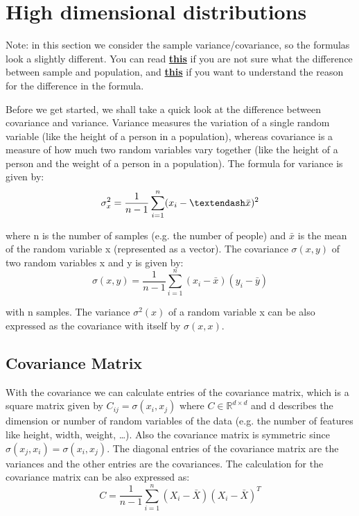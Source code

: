 \documentclass[11pt]{article}
\begin{document}
\section{High dimensional distributions}

Note: in this section we consider the sample variance/covariance, so the formulas look a slightly different. You can read {\color{blue}\href{https://www.macroption.com/population-sample-variance-standard-deviation/}{\textbf{this}}} if you are not sure what the difference between sample and population, and {\color{blue}\href{https://en.wikipedia.org/wiki/Bias_of_an_estimator}{\textbf{this}}} if you want to understand the reason for the difference in the formula. 

Before we get started, we shall take a quick look at the difference between covariance and variance. Variance measures the variation of a single random variable (like the height of a person in a population), whereas covariance is a measure of how much two random variables vary together (like the height of a person and the weight of a person in a population). The formula for variance is given by:
$$\sigma^2_x = \frac{1}{n-1} \sum^{n}_{i=1}(x_i-– \bar{x})^2 \\$$

where n is the number of samples (e.g. the number of people) and $\bar{x}$ is the mean of the random variable x (represented as a vector). The covariance $\sigma\left(x,y\right)$ of two random variables x and y is given by:
$$\sigma(x, y) = \frac{1}{n-1} \sum^{n}_{i=1}{(x_i-\bar{x})(y_i-\bar{y})}$$

with n samples. The variance $\sigma^{2}\left(x\right)$ of a random variable x can be also expressed as the covariance with itself by $\sigma\left(x,x\right)$.

\subsection{Covariance Matrix}
With the covariance we can calculate entries of the covariance matrix, which is a square matrix given by $C_{ij}=\sigma\left(x_{i},x_{j}\right)$ where $C\in\mathbb{R}^{d\times d}$ and d describes the dimension or number of random variables of the data (e.g. the number of features like height, width, weight, …). Also the covariance matrix is symmetric since $\sigma\left(x_{j},x_{i}\right)=\sigma\left(x_{i},x_{j}\right)$. The diagonal entries of the covariance matrix are the variances and the other entries are the covariances. The calculation for the covariance matrix can be also expressed as:
$$C = \frac{1}{n-1} \sum^{n}_{i=1}{(X_i-\bar{X})(X_i-\bar{X})^T}$$
\end{document}
